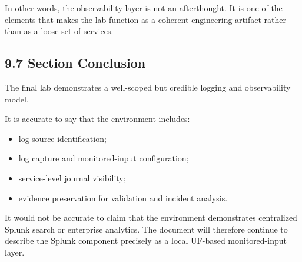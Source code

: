 \documentclass[11pt]{article}
\begin{document}
In other words, the observability layer is not an afterthought. It is one of the elements that makes the lab function as a coherent engineering artifact rather than as a loose set of services.


\subsection{9.7 Section Conclusion}
\label{sec:section-9-conclusion}

The final lab demonstrates a well-scoped but credible logging and observability model.

It is accurate to say that the environment includes:

\begin{itemize}
    \item log source identification;
    \item log capture and monitored-input configuration;
    \item service-level journal visibility;
    \item evidence preservation for validation and incident analysis.
\end{itemize}

It would not be accurate to claim that the environment demonstrates centralized Splunk search or enterprise analytics. The document will therefore continue to describe the Splunk component precisely as a local UF-based monitored-input layer.

\end{document}
